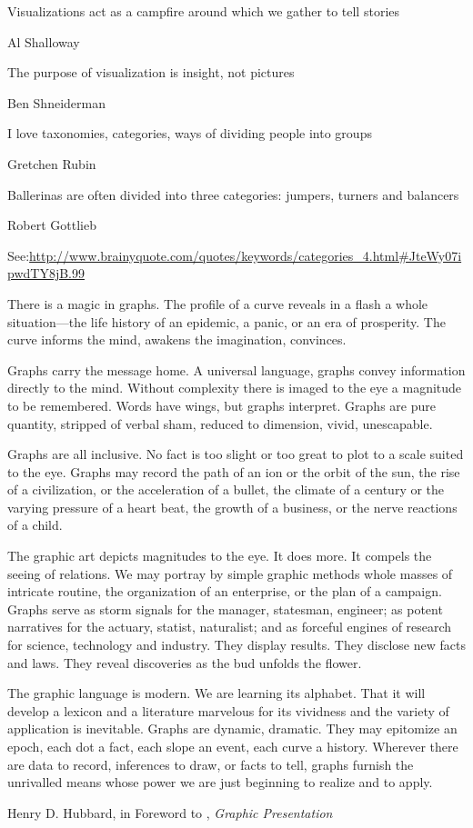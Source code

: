 \epigraph{Visualizations act as a campfire around which we gather to tell stories}{Al Shalloway}

\epigraph{The purpose of visualization is insight, not pictures}{Ben Shneiderman}


\epigraph{I love taxonomies, categories, ways of dividing people into groups}{Gretchen Rubin}

\epigraph{Ballerinas are often divided into three categories: jumpers, turners and balancers}{Robert Gottlieb}

See:\url{http://www.brainyquote.com/quotes/keywords/categories_4.html#JteWy07ipwdTY8jB.99}

\epigraph{There is a magic in graphs. The profile of a curve reveals in a flash a whole situation---the life history of an epidemic, a panic, or an era of prosperity. The curve informs the mind, awakens the imagination, convinces.

Graphs carry the message home. A universal language, graphs convey information directly to the mind. Without complexity there is imaged to the eye a magnitude to be remembered. Words have wings, but graphs interpret. Graphs are pure quantity, stripped of verbal sham, reduced to dimension, vivid, unescapable.

Graphs are all inclusive. No fact is too slight or too great to plot to a scale suited to the eye. Graphs may record the path of an ion or the orbit of the sun, the rise of a civilization, or the acceleration of a bullet, the climate of a century or the varying pressure of a heart beat, the growth of a business, or the nerve reactions of a child.

The graphic art depicts magnitudes to the eye. It does more. It compels the seeing of relations. We may portray by simple graphic methods whole masses of intricate routine, the organization of an enterprise, or the plan of a campaign. Graphs serve as storm signals for the manager, statesman, engineer; as potent narratives for the actuary, statist, naturalist; and as forceful engines of research for science, technology and industry. They display results. They disclose new facts and laws. They reveal discoveries as the bud unfolds the flower.

The graphic language is modern. We are learning its alphabet. That it will develop a lexicon and a literature marvelous for its vividness and the variety of application is inevitable. Graphs are dynamic, dramatic. They may epitomize an epoch, each dot a fact, each slope an event, each curve a history. Wherever there are data to record, inferences to draw, or facts to tell, graphs furnish the unrivalled means whose power we are just beginning to realize and to apply.}{Henry D. Hubbard, in Foreword to \citet{Brinton:1939}, \emph{Graphic Presentation}}


